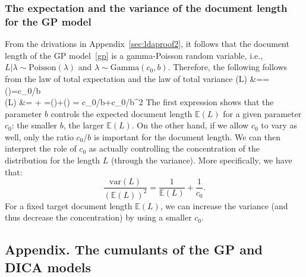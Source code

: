 \documentclass{article}
\makeatletter
\newenvironment{ma}
  {\start@align\@ne\st@rredtrue\m@ne}
  {\endalign}
\newcommand{\sbra}[1]{\left[#1\right]}
\newcommand{\gl}{\lambda}
\newcommand{\ebb}{\mathbb{E}}
\newcommand{\var}{\mathrm{var}}
\newcommand{\poi}{\mathrm{Poisson}}
\newcommand{\gam}{\mathrm{Gamma}}
\makeatother
\begin{document}
\subsubsection{The expectation and the variance of the document length for the GP model}\label{sec:L:gp}
From the drivations in Appendix~\ref{sec:ldaproof2}, it follows that the document length of the GP model~\eqref{gp} is a gamma-Poisson random variable, i.e., $L|\gl \sim\poi(\gl)$ and $\gl \sim \gam(c_0,b)$. Therefore, the following follows from the law of total expectation and the law of total variance
\begin{ma}
\ebb(L) &=\ebb\sbra{\ebb(L|\gl)} = \ebb(\gl)=c_0/b \\
\var(L) &= \var \sbra{\ebb(L|\gl)} + \ebb\sbra{\var(L|\gl)}=\var(\gl)+\ebb(\gl) = c_0/b+c_0/b^2
\end{ma}
The first expression shows that the parameter $b$ controls the expected document length $\ebb(L)$ for a given parameter $c_0$: the smaller $b$, the larger $\ebb(L)$. On the other hand, if we allow $c_0$ to vary as well, only the ratio $c_0/b$ is important for the document length. We can then interpret the role of $c_0$ as actually controlling the concentration of the distribution for the length $L$ (through the variance). More specifically, we have that:
\begin{equation} \label{eq:concentrationL_GP}
\frac{\var(L)}{(\ebb(L))^2} = \frac{1}{\ebb(L)} + \frac{1}{c_0}.
\end{equation}
For a fixed target document length $\ebb(L)$, we can increase the variance (and thus decrease the concentration) by using a smaller $c_0$.



























\subsection{Appendix. The cumulants of the GP and DICA models} \label{sec:app:dicacum}
\end{document}
